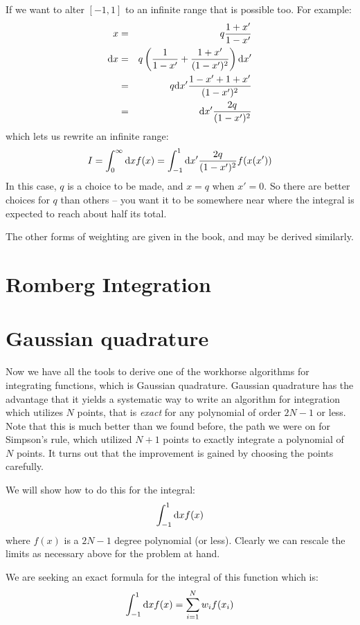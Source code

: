 If we want to alter $[-1, 1]$ to an infinite range that is possible
too.  For example:
\begin{eqnarray}
x &=& q \frac{1+x'}{1-x'}  \cr
{\rm d}x &=& q \left(\frac{1}{1-x'} + \frac{1+x'}{(1-x')^2}\right){\rm
d}x'\cr
&=& q {\rm d}x' \frac{1 -x' + 1 + x'}{(1-x')^2}  \cr
&=& {\rm d}x' \frac{2q}{(1-x')^2}  \cr
\end{eqnarray}
which lets us rewrite an infinite range:
\begin{equation}
 I = \int_0^\infty {\rm d}x f(x) = \int_{-1}^{1} {\rm d}x'
 \frac{2q}{(1-x')^2} f(x(x'))
\end{equation}
In this case, $q$ is a choice to be made, and $x=q$ when $x'=0$. So
there are better choices for $q$ than others -- you want it to be
somewhere near where the integral is expected to reach about half its
total.

The other forms of weighting are given in the book, and may be derived
similarly. 

\section{Romberg Integration}


\section{Gaussian quadrature}

Now we have all the tools to derive one of the workhorse algorithms
for integrating functions, which is Gaussian quadrature. Gaussian
quadrature has the advantage that it yields a systematic way to write
an algorithm for integration which utilizes $N$ points, that is {\it
  exact} for any polynomial of order $2N-1$ or less. Note that this is
much better than we found before, the path we were on for Simpson's
rule, which utilized $N+1$ points to exactly integrate a polynomial of
$N$ points. It turns out that the improvement is gained by choosing
the points carefully.

We will show how to do this for the integral:
\begin{equation}
\int_{-1}^{1} {\rm d}x f(x)
\end{equation}
where $f(x)$ is a $2N-1$ degree polynomial (or less).  Clearly we can
rescale the limits as necessary above for the problem at hand.

We are seeking an exact formula for the integral of this function
which is:
\begin{equation}
\int_{-1}^{1} {\rm d}x f(x) = \sum_{i=1}^N w_i f(x_i)
\end{equation}

